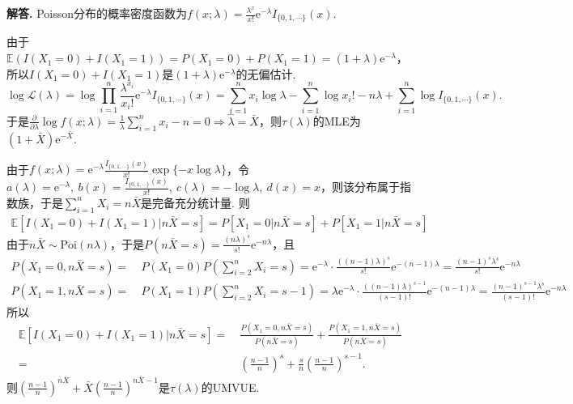 \documentclass[12pt, a4paper, oneside]{ctexart}
\newenvironment{solution}[1][]{\par\noindent\textbf{#1解答. }}{\smallskip\par}  %
\def\E{\mathbb{E}}          %
\def\e{\mathrm{e}}          %
\def\L{\mathcal{L}}         %
\begin{document}
\begin{solution}
    Poisson分布的概率密度函数为$f(x;\lambda) = \frac{\lambda^x}{x!}\e^{-\lambda}I_{\{0,1,\cdots\}}(x)$.

    由于$\E(I(X_1=0)+I(X_1=1)) = P(X_1=0)+P(X_1=1) = (1+\lambda)\e^{-\lambda}$，所以$I(X_1=0)+I(X_1=1)$是$(1+\lambda)\e^{-\lambda}$的无偏估计.
    \begin{equation*}
        \log\L(\lambda) = \log\prod_{i=1}^n\frac{\lambda^{x_i}}{x_i!}\e^{-\lambda}I_{\{0,1,\cdots\}}(x) = \sum_{i=1}^nx_i\log\lambda - \sum_{i=1}^n\log x_i!-n\lambda + \sum_{i=1}^n\log I_{\{0,1,\cdots\}}(x).
    \end{equation*}
    于是$\frac{\partial}{\partial\lambda}\log f(x;\lambda) = \frac{1}{\lambda}\sum_{i=1}^nx_i-n = 0\Rightarrow \hat{\lambda} = \bar{X}$，则$\tau(\lambda)$的MLE为$(1+\bar{X})\e^{-\bar{X}}$.

    由于$f(x;\lambda) = \e^{-\lambda}\frac{I_{\{0,1,\cdots\}}(x)}{x!}\exp\{-x\log \lambda\}$，令$a(\lambda) = \e^{-\lambda},\ b(x) = \frac{I_{\{0,1,\cdots\}}(x)}{x!},\ c(\lambda) = -\log\lambda,\ d(x) = x$，则该分布属于指数族，于是$\sum_{i=1}^nX_i=n\bar{X}$是完备充分统计量. 则
    \begin{align*}
        \E\left[I(X_1=0)+I(X_1=1)|n\bar{X}=s\right] = P\left[X_1=0|n\bar{X}=s\right]+P\left[X_1=1|n\bar{X}=s\right]
    \end{align*}
    由于$n\bar{X}\sim\text{Poi}(n\lambda)$，于是$P(n\bar{X} = s) = \frac{(n\lambda)^s}{s!}\e^{-n\lambda}$，且
    \begin{align*}
        P(X_1=0,n\bar{X} = s) =&\ P(X_1 = 0)P(\sum_{i=2}^nX_i = s) = \e^{-\lambda}\cdot\frac{((n-1)\lambda)^s}{s!}\e^{-(n-1)\lambda} = \frac{(n-1)^s\lambda^s}{s!}\e^{-n\lambda}\\
        P(X_1=1,n\bar{X} = s) =&\ P(X_1 = 1)P(\sum_{i=2}^nX_i = s-1) = \lambda\e^{-\lambda}\cdot\frac{((n-1)\lambda)^{s-1}}{(s-1)!}\e^{-(n-1)\lambda} = \frac{(n-1)^{s-1}\lambda^s}{(s-1)!}\e^{-n\lambda}
    \end{align*}
    所以
    \begin{align*}
        \E\left[I(X_1=0)+I(X_1=1)|n\bar{X}=s\right] =&\ \frac{P(X_1=0,n\bar{X} = s)}{P(n\bar{X} = s)}+\frac{P(X_1=1,n\bar{X} = s)}{P(n\bar{X} = s)}\\
        =&\ \left(\frac{n-1}{n}\right)^s+\frac{s}{n}\left(\frac{n-1}{n}\right)^{s-1}.
    \end{align*}
    则$\left(\frac{n-1}{n}\right)^{n\bar{X}}+\bar{X}\left(\frac{n-1}{n}\right)^{n\bar{X}-1}$是$\tau(\lambda)$的UMVUE.
\end{solution}
\end{document}
